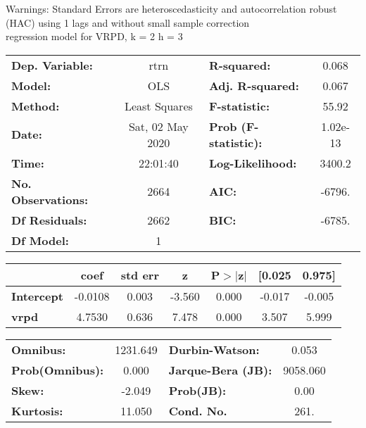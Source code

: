 Warnings: \newline
 [1] Standard Errors are heteroscedasticity and autocorrelation robust (HAC) using 1 lags and without small sample correction\\ 

regression model for VRPD, k = 2 h = 3\begin{center}
\begin{tabular}{lclc}
\toprule
\textbf{Dep. Variable:}    &       rtrn       & \textbf{  R-squared:         } &     0.068   \\
\textbf{Model:}            &       OLS        & \textbf{  Adj. R-squared:    } &     0.067   \\
\textbf{Method:}           &  Least Squares   & \textbf{  F-statistic:       } &     55.92   \\
\textbf{Date:}             & Sat, 02 May 2020 & \textbf{  Prob (F-statistic):} &  1.02e-13   \\
\textbf{Time:}             &     22:01:40     & \textbf{  Log-Likelihood:    } &    3400.2   \\
\textbf{No. Observations:} &        2664      & \textbf{  AIC:               } &    -6796.   \\
\textbf{Df Residuals:}     &        2662      & \textbf{  BIC:               } &    -6785.   \\
\textbf{Df Model:}         &           1      & \textbf{                     } &             \\
\bottomrule
\end{tabular}
\begin{tabular}{lcccccc}
                   & \textbf{coef} & \textbf{std err} & \textbf{z} & \textbf{P$> |$z$|$} & \textbf{[0.025} & \textbf{0.975]}  \\
\midrule
\textbf{Intercept} &      -0.0108  &        0.003     &    -3.560  &         0.000        &       -0.017    &       -0.005     \\
\textbf{vrpd}      &       4.7530  &        0.636     &     7.478  &         0.000        &        3.507    &        5.999     \\
\bottomrule
\end{tabular}
\begin{tabular}{lclc}
\textbf{Omnibus:}       & 1231.649 & \textbf{  Durbin-Watson:     } &    0.053  \\
\textbf{Prob(Omnibus):} &   0.000  & \textbf{  Jarque-Bera (JB):  } & 9058.060  \\
\textbf{Skew:}          &  -2.049  & \textbf{  Prob(JB):          } &     0.00  \\
\textbf{Kurtosis:}      &  11.050  & \textbf{  Cond. No.          } &     261.  \\
\bottomrule
\end{tabular}
\end{center}

